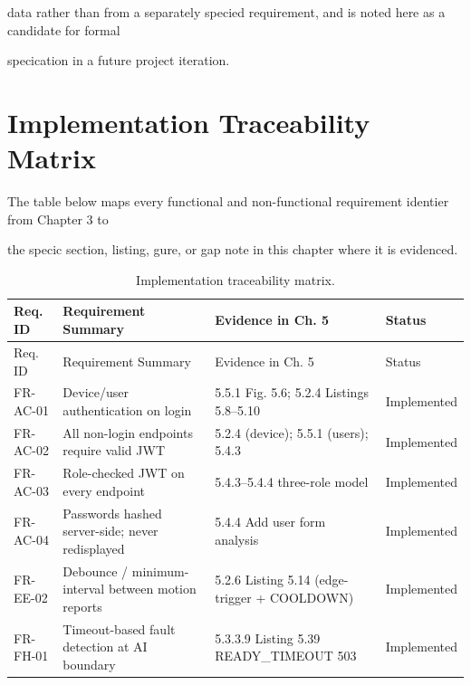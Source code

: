 data rather than from a separately specied requirement, and is noted here as a candidate for formal

specication in a future project iteration.


\section{Implementation Traceability Matrix}
The table below maps every functional and non-functional requirement identier from Chapter 3 to

the specic section, listing, gure, or gap note in this chapter where it is evidenced.

\begin{longtable}{llll}
	\caption{Implementation traceability matrix.}
	\label{tab:5-5}                                                                                                                                            \\
	\toprule
	Req. ID     & Requirement Summary                                    & Evidence in Ch. 5                                             & Status              \\
	\midrule
	\endfirsthead
	\toprule
	Req. ID     & Requirement Summary                                    & Evidence in Ch. 5                                             & Status              \\
	\midrule
	\endhead
	\bottomrule
	\endfoot
	FR-AC-01    & Device/user authentication on login                    & 5.5.1 Fig. 5.6; 5.2.4 Listings 5.8--5.10                      & Implemented         \\
	FR-AC-02    & All non-login endpoints require valid JWT              & 5.2.4 (device); 5.5.1 (users); 5.4.3                          & Implemented         \\
	FR-AC-03    & Role-checked JWT on every endpoint                     & 5.4.3--5.4.4 three-role model                                 & Implemented         \\
	FR-AC-04    & Passwords hashed server-side; never redisplayed        & 5.4.4 Add user form analysis                                  & Implemented         \\
	FR-EE-02    & Debounce / minimum-interval between motion reports     & 5.2.6 Listing 5.14 (edge-trigger + COOLDOWN)                  & Implemented         \\
	FR-FH-01    & Timeout-based fault detection at AI boundary           & 5.3.3.9 Listing 5.39 READY\_TIMEOUT 503                       & Implemented         \\

\end{longtable}
